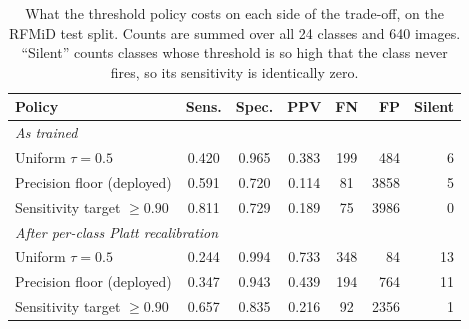 \begin{table}[!t]
\centering
\caption{What the threshold policy costs on each side of the trade-off, on the RFMiD test split.
Counts are summed over all 24 classes and 640 images. ``Silent'' counts classes whose threshold
is so high that the class never fires, so its sensitivity is identically zero.}
\label{tab:operating}
\scriptsize
\setlength{\tabcolsep}{3.5pt}
\begin{tabular}{lccccrr}
\toprule
Policy & Sens. & Spec. & PPV & FN & FP & Silent \\
\midrule
\multicolumn{7}{l}{\emph{As trained}} \\
\quad Uniform $\tau{=}0.5$ & 0.420 & 0.965 & 0.383 & 199 & 484 & 6 \\
\quad Precision floor (deployed) & 0.591 & 0.720 & 0.114 & 81 & 3858 & 5 \\
\quad Sensitivity target $\geq 0.90$ & 0.811 & 0.729 & 0.189 & 75 & 3986 & 0 \\
\midrule \multicolumn{7}{l}{\emph{After per-class Platt recalibration}} \\
\quad Uniform $\tau{=}0.5$ & 0.244 & 0.994 & 0.733 & 348 & 84 & 13 \\
\quad Precision floor (deployed) & 0.347 & 0.943 & 0.439 & 194 & 764 & 11 \\
\quad Sensitivity target $\geq 0.90$ & 0.657 & 0.835 & 0.216 & 92 & 2356 & 1 \\
\bottomrule
\end{tabular}
\end{table}

